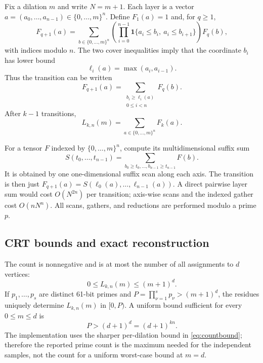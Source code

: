 \documentclass[11pt]{article}
\begin{document}
Fix a dilation $m$ and write $N=m+1$.  Each layer is a vector
$a=(a_0,\ldots,a_{n-1})\in\{0,\ldots,m\}^n$.  Define $F_1(a)=1$ and, for
$q\geq1$,
\begin{equation}
  F_{q+1}(a)=
  \sum_{b\in\{0,\ldots,m\}^n}
  \left(\prod_{i=0}^{n-1}
  \mathbf{1}\{a_i\leq b_i,\ a_i\leq b_{i+1}\}\right)F_q(b),
  \label{eq:transfer}
\end{equation}
with indices modulo $n$.  The two cover inequalities imply that the
coordinate $b_i$ has lower bound
\[
  \ell_i(a)=\max(a_i,a_{i-1}).
\]
Thus the transition can be written
\begin{equation}
  F_{q+1}(a)=
  \sum_{\substack{b_i\geq\ell_i(a)\\0\leq i<n}}F_q(b).
  \label{eq:orthant}
\end{equation}
After $k-1$ transitions,
\[
  L_{k,n}(m)=\sum_{a\in\{0,\ldots,m\}^n}F_k(a).
\]

For a tensor $F$ indexed by $\{0,\ldots,m\}^n$, compute its multidimensional
suffix sum
\[
  S(t_0,\ldots,t_{n-1})
  =\sum_{b_0\geq t_0,\ldots,b_{n-1}\geq t_{n-1}}F(b).
\]
It is obtained by one one-dimensional suffix scan along each axis.  The
transition is then just
$F_{q+1}(a)=S(\ell_0(a),\ldots,\ell_{n-1}(a))$.  A direct pairwise layer
sum would cost $O(N^{2n})$ per transition; axis-wise scans and the indexed
gather cost $O(nN^n)$.  All scans, gathers, and reductions are performed
modulo a prime $p$.

\subsection{CRT bounds and exact reconstruction}

The count is nonnegative and is at most the number of all assignments to
$d$ vertices:
\begin{equation}
  0\leq L_{k,n}(m)\leq(m+1)^d.
  \label{eq:countbound}
\end{equation}
If $p_1,\ldots,p_s$ are distinct 61-bit primes and
$P=\prod_{\nu=1}^s p_\nu>(m+1)^d$, the residues uniquely determine
$L_{k,n}(m)$ in $[0,P)$.  A uniform bound sufficient for every
$0\leq m\leq d$ is
\[
  P>(d+1)^d=(d+1)^{kn}.
\]
The implementation uses the sharper per-dilation bound in
\eqref{eq:countbound}; therefore the reported prime count is the maximum
needed for the independent samples, not the count for a uniform
worst-case bound at $m=d$.
\end{document}
